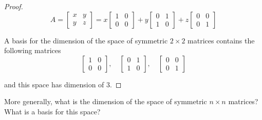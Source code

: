 \begin{proof}
    \[
        A = \begin{bmatrix}
            x & y \\
            y & z
        \end{bmatrix}
        = x\begin{bmatrix}
            1 & 0 \\
            0 & 0
        \end{bmatrix}
        + y\begin{bmatrix}
            0 & 1 \\
            1 & 0
        \end{bmatrix}
        + z\begin{bmatrix}
            0 & 0 \\
            0 & 1
        \end{bmatrix}
    \]

    A basis for the dimension of the space of symmetric $2\times 2$ matrices contains the following matrices
    \[
        \begin{bmatrix}
            1 & 0 \\
            0 & 0
        \end{bmatrix},\quad
        \begin{bmatrix}
            0 & 1 \\
            1 & 0
        \end{bmatrix},\quad
        \begin{bmatrix}
            0 & 0 \\
            0 & 1
        \end{bmatrix}
    \]

    and this space has dimension of $3$.
\end{proof}

\begin{exercise}
    More generally, what is the dimension of the space of symmetric $n\times n$ matrices? What is a basis for this space?
\end{exercise}

